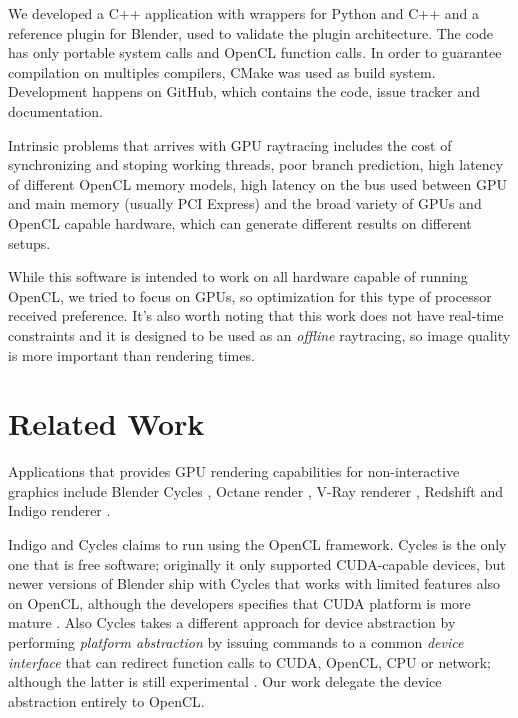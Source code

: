 \documentclass[a4paper]{sbgames}               %
\begin{document}
We developed a C++ application with wrappers for
Python %
and C++ and a reference plugin for Blender, used to validate the
plugin architecture. The code has only portable system calls and
OpenCL function calls. In order to guarantee compilation on multiples
compilers, CMake was used as build system. Development happens on
GitHub, which contains the code, issue tracker and
documentation\cite{RenderGirl}.

Intrinsic problems that arrives with GPU raytracing includes the cost
of synchronizing and stoping working threads, poor branch prediction,
high latency of different OpenCL memory models, high latency on the
bus used between GPU and main memory (usually PCI Express) and the
broad variety of GPUs and OpenCL capable hardware, which can generate
different results on different setups.

While this software is intended to work on all hardware capable of
running OpenCL, we tried to focus on GPUs, so optimization for this
type of processor received preference. It's also worth noting that
this work does not have real-time constraints and it is designed to be
used as an \emph{offline} raytracing, so image quality is more
important than rendering times.

\section{Related Work}
\label{sec:related-work}

Applications that provides GPU rendering capabilities for
non-interactive graphics include Blender Cycles\cite{Cycles} , Octane
render \cite{Octane}, V-Ray renderer \cite{VRAY}, Redshift
\cite{Redshift} and Indigo renderer \cite{Indigo}.

Indigo and Cycles claims to run using the OpenCL framework. Cycles
is the only one that is free software; originally it only supported
CUDA-capable devices, but newer versions of Blender ship with Cycles
that works with limited features also on OpenCL, although the
developers specifies that CUDA platform is more mature \cite{Cycles}.
Also Cycles takes a different approach for device abstraction by
performing \emph{platform abstraction} by issuing commands to a common
\emph{device interface} that can redirect function calls to CUDA,
OpenCL, CPU or network; although the latter is still experimental
\cite{CyclesDevel}. Our work delegate the device abstraction entirely
to OpenCL.
\end{document}
